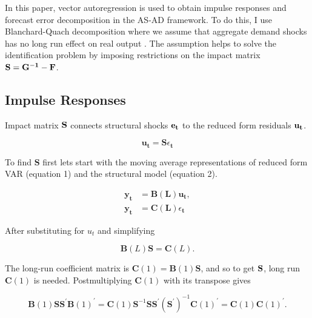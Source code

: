 \documentclass[a4paper,12pt]{article}
\begin{document}
In this paper, vector autoregression is used to obtain impulse responses and forecast error decomposition in the AS-AD framework. To do this, I use Blanchard-Quach decomposition where we assume that aggregate demand shocks has no long run effect on real output \citep{blanchardquah89}. The assumption helps to solve the identification problem by imposing restrictions on the impact matrix \(\bf S = G^{-1}-F\).


\subsection{Impulse Responses}

Impact matrix \(\bf S\) connects structural shocks \(\bf e_t\) to the reduced form residuals \(\bf u_t\).

\begin{equation} \label{eq:5}
		\mathbf{u}_{\mathbf{t}}=\mathbf{S} \epsilon_{\mathbf{t}}
\end{equation}

To find \(\mathbf{S}\) first lets start with the moving average representations of reduced form VAR (equation 1) and the structural model (equation 2).

\begin{equation} \label{eq:6}
\begin{split}
		\mathbf{y}_{\mathbf{t}} &=\mathbf{B}(\mathbf{L}) \mathbf{u}_{\mathbf{t}}, \\
		\mathbf{y}_{\mathbf{t}} &=\mathbf{C}(\mathbf{L}) \epsilon_{\mathbf{t}}
\end{split}
\end{equation}

After substituting for \(u_t\) and simplifying

\begin{equation} \label{eq:7}
		\mathbf{B}(L) \mathbf{S}=\mathbf{C}(L).
\end{equation}

The long-run coefficient matrix is \(\mathbf{C}(1) = \mathbf{B}(1)\mathbf{S}\), and so to get \(\bf S\), long run \(\mathbf{C}(1)\) is needed. Postmultiplying \(\mathbf{C}(1)\) with its transpose gives

\begin{equation} \label{eq:8}
		\mathbf{B}(1) \mathbf{S S}^{\prime} \mathbf{B}(1)^{\prime}=\mathbf{C}(1) \mathbf{S}^{-1} \mathbf{S} \mathbf{S}^{\prime}\left(\mathbf{S}^{\prime}\right)^{-1} \mathbf{C}(1)^{\prime}=\mathbf{C}(1) \mathbf{C}(1)^{\prime}.
\end{equation}
\end{document}
